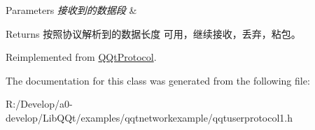 \begin{DoxyParams}{Parameters}
{\em 接收到的数据段} & \\
\hline
\end{DoxyParams}
\begin{DoxyReturn}{Returns}
按照协议解析到的数据长度 可用，继续接收，丢弃，粘包。 
\end{DoxyReturn}


Reimplemented from \mbox{\hyperlink{class_q_qt_protocol_a00fd0c1ac23379ed3b9b25da9a34f39b}{Q\+Qt\+Protocol}}.



The documentation for this class was generated from the following file\+:\begin{DoxyCompactItemize}
\item 
R\+:/\+Develop/a0-\/develop/\+Lib\+Q\+Qt/examples/qqtnetworkexample/qqtuserprotocol1.\+h\end{DoxyCompactItemize}
